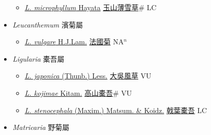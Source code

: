\begin{itemize}
  \begin{itemize}
        \item[] \href{http://www.theplantlist.org/tpl1.1/search?q=Leontopodium+microphyllum}{\textit{L. microphyllum} Hayata}   \href{\detokenize{http://taibnet.sinica.edu.tw/chi/taibnet_species_list.php?T2=玉山薄雪草&T2_new_value=true&fr=y}}{玉山薄雪草}\# LC
  \end{itemize}
 \item[] \textit{Leucanthemum} 濱菊屬
                    
  \begin{itemize}
        \item[] \href{http://www.theplantlist.org/tpl1.1/search?q=Leucanthemum+vulgare}{\textit{L. vulgare} H.J.Lam.}   \href{\detokenize{http://taibnet.sinica.edu.tw/chi/taibnet_species_list.php?T2=法國菊&T2_new_value=true&fr=y}}{法國菊} NA$^n$
  \end{itemize}
 \item[] \textit{Ligularia} 橐吾屬
                    
  \begin{itemize}
        \item[] \href{http://www.theplantlist.org/tpl1.1/search?q=Ligularia+japonica}{\textit{L. japonica} (Thunb.) Less.}   \href{\detokenize{http://taibnet.sinica.edu.tw/chi/taibnet_species_list.php?T2=大吳風草&T2_new_value=true&fr=y}}{大吳風草} VU
        \item[] \href{http://www.theplantlist.org/tpl1.1/search?q=Ligularia+kojimae}{\textit{L. kojimae} Kitam.}   \href{\detokenize{http://taibnet.sinica.edu.tw/chi/taibnet_species_list.php?T2=高山橐吾&T2_new_value=true&fr=y}}{高山橐吾}\# VU
        \item[] \href{http://www.theplantlist.org/tpl1.1/search?q=Ligularia+stenocephala}{\textit{L. stenocephala} (Maxim.) Matsum. \& Koidz.}   \href{\detokenize{http://taibnet.sinica.edu.tw/chi/taibnet_species_list.php?T2=戟葉橐吾&T2_new_value=true&fr=y}}{戟葉橐吾} LC
  \end{itemize}
 \item[] \textit{Matricaria} 野菊屬
                    

\end{itemize}
